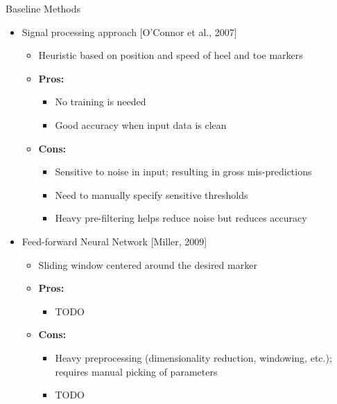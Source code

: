 \documentclass{beamer}
\begin{document}
\begin{frame}{Baseline Methods}
    \begin{itemize}
        \item
            Signal processing approach [O'Connor et al., 2007]
            \begin{itemize}
                \item Heuristic based on position and speed of heel and toe markers
                \item \textbf{Pros:}
                \begin{itemize}
                    \item No training is needed
                    \item Good accuracy when input data is clean
                \end{itemize}
                \item \textbf{Cons:}
                \begin{itemize}
                    \item Sensitive to noise in input; resulting in gross mis-predictions
                    \item Need to manually specify sensitive thresholds
                    \item Heavy pre-filtering helps reduce noise but reduces accuracy
                \end{itemize}
            \end{itemize}
        \item
            Feed-forward Neural Network [Miller, 2009]
            \begin{itemize}
                \item
                    Sliding window centered around the desired marker
                \item \textbf{Pros:}
                \begin{itemize}
                    \item TODO %
                \end{itemize}
                \item \textbf{Cons:}
                \begin{itemize}
                    \item Heavy preprocessing (dimensionality reduction, windowing, etc.); requires manual picking of parameters
                    \item TODO %
                \end{itemize}
            \end{itemize}
    \end{itemize}
\end{frame}
\end{document}
